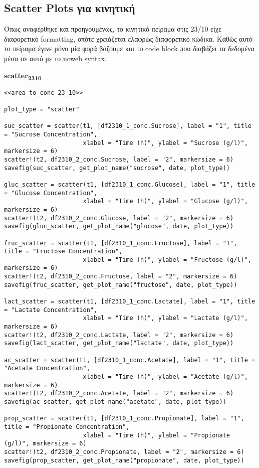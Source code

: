 \documentclass[11pt]{article}
\begin{document}
\subsection{Scatter Plots για κινητική}
\label{sec:org657d4c2}
Όπως αναφέρθηκε και προηγουμένως, το κινητικό πείραμα στις 23/10 είχε διαφορετικό formatting, οπότε χρειάζεται ελαφρώς διαφορετικό κώδικα. Καθώς αυτό το πείραμα έγινε μόνο μία φορά βάζουμε και το code block που διαβάζει τα δεδομένα μέσα σε αυτό με το noweb syntax.

\textbf{scatter\textsubscript{23}\textsubscript{10}}
\begin{verbatim}
<<area_to_conc_23_10>>

plot_type = "scatter"

suc_scatter = scatter(t1, [df2310_1_conc.Sucrose], label = "1", title = "Sucrose Concentration",
                      xlabel = "Time (h)", ylabel = "Sucrose (g/l)", markersize = 6)
scatter!(t2, df2310_2_conc.Sucrose, label = "2", markersize = 6)
savefig(suc_scatter, get_plot_name("sucrose", date, plot_type))

gluc_scatter = scatter(t1, [df2310_1_conc.Glucose], label = "1", title = "Glucose Concentration",
                      xlabel = "Time (h)", ylabel = "Glucose (g/l)", markersize = 6)
scatter!(t2, df2310_2_conc.Glucose, label = "2", markersize = 6)
savefig(gluc_scatter, get_plot_name("glucose", date, plot_type))

fruc_scatter = scatter(t1, [df2310_1_conc.Fructose], label = "1", title = "Fructose Concentration",
                      xlabel = "Time (h)", ylabel = "Fructose (g/l)", markersize = 6)
scatter!(t2, df2310_2_conc.Fructose, label = "2", markersize = 6)
savefig(fruc_scatter, get_plot_name("fructose", date, plot_type))

lact_scatter = scatter(t1, [df2310_1_conc.Lactate], label = "1", title = "Lactate Concentration",
                      xlabel = "Time (h)", ylabel = "Lactate (g/l)", markersize = 6)
scatter!(t2, df2310_2_conc.Lactate, label = "2", markersize = 6)
savefig(lact_scatter, get_plot_name("lactate", date, plot_type))

ac_scatter = scatter(t1, [df2310_1_conc.Acetate], label = "1", title = "Acetate Concentration",
                      xlabel = "Time (h)", ylabel = "Acetate (g/l)", markersize = 6)
scatter!(t2, df2310_2_conc.Acetate, label = "2", markersize = 6)
savefig(ac_scatter, get_plot_name("acetate", date, plot_type))

prop_scatter = scatter(t1, [df2310_1_conc.Propionate], label = "1", title = "Propionate Concentration",
                      xlabel = "Time (h)", ylabel = "Propionate (g/l)", markersize = 6)
scatter!(t2, df2310_2_conc.Propionate, label = "2", markersize = 6)
savefig(prop_scatter, get_plot_name("propionate", date, plot_type))


\end{verbatim}
\end{document}
